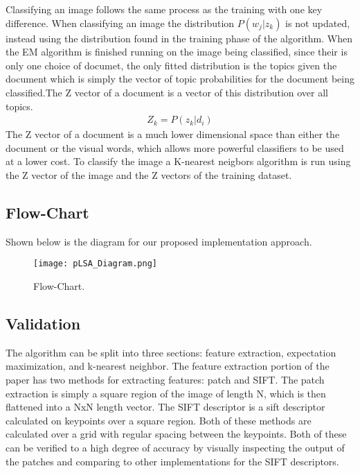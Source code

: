 \documentclass[conference]{IEEEtran}
\begin{document}
Classifying an image follows the same process as the training with one key difference. When classifying an image the distribution $P(w_j | z_k)$ is not updated, instead using the distribution found in the training phase of the algorithm. When the EM algorithm is finished running on the image being classified, since their is only one choice of documet, the only fitted distribution is the topics given the document which is simply the vector of topic probabilities for the document being classified.The Z vector of a document is a vector of this distribution over all topics.
\begin{align*}
Z_k = P(z_k|d_i)
\end{align*}
The Z vector of a document is a much lower dimensional space than either the document or the visual words, which allows more powerful classifiers to be used at a lower cost. To classify the image a K-nearest neigbors algorithm is run using the Z vector of the image and the Z vectors of the training dataset.


\subsection{Flow-Chart}
Shown below is the diagram for our proposed implementation approach.
\begin{figure}[h!]
  \texttt{[image: pLSA\_Diagram.png]}
  \caption{Flow-Chart.}
\end{figure}
\subsection{Validation}
The algorithm can be split into three sections: feature extraction, expectation maximization, and k-nearest neighbor. The feature extraction portion of the paper has two methods for extracting features: patch and SIFT. The patch extraction is simply a square region of the image of length N, which is then flattened into a NxN length vector. The SIFT descriptor is a sift descriptor calculated on keypoints over a square region. Both of these methods are calculated over a grid with regular spacing between the keypoints. Both of these can be verified to a high degree of accuracy by visually inspecting the output of the patches and comparing to other implementations for the SIFT descriptors.\\
\end{document}
